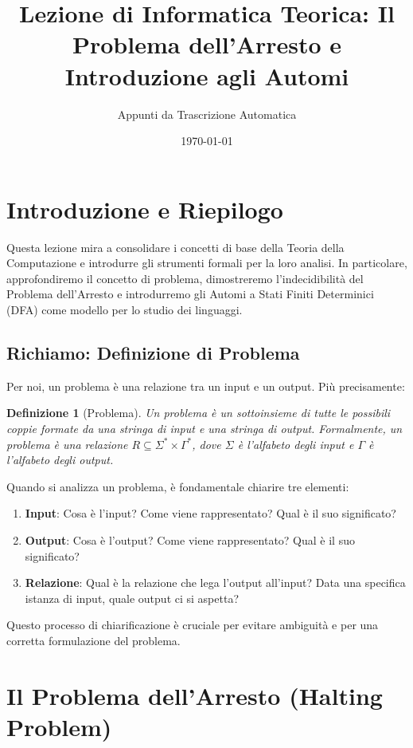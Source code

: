\documentclass[a4paper]{article}
\title{Lezione di Informatica Teorica: Il Problema dell'Arresto e Introduzione agli Automi}
\author{Appunti da Trascrizione Automatica}
\date{\today}
\newtheorem{definition}{Definizione}
\begin{document}
\maketitle
\tableofcontents
\newpage

\section{Introduzione e Riepilogo}

Questa lezione mira a consolidare i concetti di base della Teoria della Computazione e introdurre gli strumenti formali per la loro analisi. In particolare, approfondiremo il concetto di problema, dimostreremo l'indecidibilità del Problema dell'Arresto e introdurremo gli Automi a Stati Finiti Determinici (DFA) come modello per lo studio dei linguaggi.

\subsection{Richiamo: Definizione di Problema}

Per noi, un problema è una relazione tra un input e un output. Più precisamente:

\begin{definition}[Problema]
Un problema è un sottoinsieme di tutte le possibili coppie formate da una stringa di input e una stringa di output.
Formalmente, un problema è una relazione $R \subseteq \Sigma^* \times \Gamma^*$, dove $\Sigma$ è l'alfabeto degli input e $\Gamma$ è l'alfabeto degli output.
\end{definition}

Quando si analizza un problema, è fondamentale chiarire tre elementi:
\begin{enumerate}
    \item \textbf{Input}: Cosa è l'input? Come viene rappresentato? Qual è il suo significato?
    \item \textbf{Output}: Cosa è l'output? Come viene rappresentato? Qual è il suo significato?
    \item \textbf{Relazione}: Qual è la relazione che lega l'output all'input? Data una specifica istanza di input, quale output ci si aspetta?
\end{enumerate}
Questo processo di chiarificazione è cruciale per evitare ambiguità e per una corretta formulazione del problema.

\section{Il Problema dell'Arresto (Halting Problem)}
\end{document}

